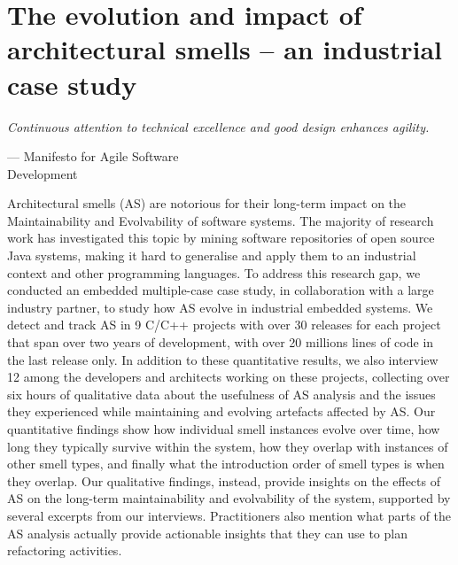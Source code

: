 \setlength{\headheight}{1.2cm}
\renewcommand{\publ}{\flushleft\footnotesize{Based on:\\[0.1cm]
		\textit{D. Sas, P. Avgeriou, and U. Uyumaz. "On the evolution and impact of architectural smells—an industrial case study." Empirical Software Engineering 27.4 (2022): 1-45.} \\[0.1cm]
}}

\chapter{The evolution and impact of architectural smells -- an industrial case study}
\label{chap:4}

\epigraph{\emph{Continuous attention to technical excellence
and good design enhances agility.}}{--- Manifesto for Agile Software\\Development}

\begin{Abstract}
	Architectural smells (AS) are notorious for their  long-term impact on the Maintainability and Evolvability of software systems.
	The majority of research work has investigated this topic by mining software repositories of open source Java systems, making it hard to generalise and apply them to an industrial context and other programming languages.
	To address this research gap, we conducted an embedded multiple-case case study, in collaboration with a large industry partner, to study how AS evolve in industrial embedded systems.
	We detect and track AS in 9 C/C++ projects with over 30 releases for each project that span over two years of development, with over 20 millions lines of code in the last release only.
	In addition to these quantitative results, we also interview 12 among the developers and architects working on these projects, collecting over six hours of qualitative data about the usefulness of AS analysis and the issues they experienced while maintaining and evolving artefacts affected by AS.
	Our quantitative findings show how individual smell instances evolve over time, how long they typically survive within the system, how they overlap with instances of other smell types, and finally what the introduction order of smell types is when they overlap.
	Our qualitative findings, instead, provide insights on the effects of AS on the long-term maintainability and evolvability of the system, supported by several excerpts from our interviews. Practitioners also mention what parts of the AS analysis actually provide actionable insights that they can use to plan refactoring activities.
\end{Abstract}

